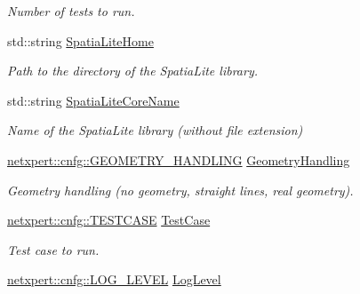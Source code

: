 \begin{DoxyCompactItemize}
\begin{DoxyCompactList}\small\item\em Number of tests to run. \end{DoxyCompactList}\item 
std\+::string \hyperlink{structnetxpert_1_1cnfg_1_1Config_a30e9c138aaee454b4b9f178a5d9fec0a}{Spatia\+Lite\+Home}\hypertarget{structnetxpert_1_1cnfg_1_1Config_a30e9c138aaee454b4b9f178a5d9fec0a}{}\label{structnetxpert_1_1cnfg_1_1Config_a30e9c138aaee454b4b9f178a5d9fec0a}

\begin{DoxyCompactList}\small\item\em Path to the directory of the Spatia\+Lite library. \end{DoxyCompactList}\item 
std\+::string \hyperlink{structnetxpert_1_1cnfg_1_1Config_a4df2574cae792012d65db17eaf3d0a22}{Spatia\+Lite\+Core\+Name}\hypertarget{structnetxpert_1_1cnfg_1_1Config_a4df2574cae792012d65db17eaf3d0a22}{}\label{structnetxpert_1_1cnfg_1_1Config_a4df2574cae792012d65db17eaf3d0a22}

\begin{DoxyCompactList}\small\item\em Name of the Spatia\+Lite library (without file extension) \end{DoxyCompactList}\item 
\hyperlink{namespacenetxpert_1_1cnfg_a1514d3ae51414bf0bcd8d1fe8e868b89}{netxpert\+::cnfg\+::\+G\+E\+O\+M\+E\+T\+R\+Y\+\_\+\+H\+A\+N\+D\+L\+I\+NG} \hyperlink{structnetxpert_1_1cnfg_1_1Config_abad7200444a8c97b59bc6978a7abeae6}{Geometry\+Handling}\hypertarget{structnetxpert_1_1cnfg_1_1Config_abad7200444a8c97b59bc6978a7abeae6}{}\label{structnetxpert_1_1cnfg_1_1Config_abad7200444a8c97b59bc6978a7abeae6}

\begin{DoxyCompactList}\small\item\em Geometry handling (no geometry, straight lines, real geometry). \end{DoxyCompactList}\item 
\hyperlink{namespacenetxpert_1_1cnfg_ae473d83baf6d2ee9328c66364eefc8df}{netxpert\+::cnfg\+::\+T\+E\+S\+T\+C\+A\+SE} \hyperlink{structnetxpert_1_1cnfg_1_1Config_a73f9299fb8e35e1f4a9946f37dc3d17c}{Test\+Case}\hypertarget{structnetxpert_1_1cnfg_1_1Config_a73f9299fb8e35e1f4a9946f37dc3d17c}{}\label{structnetxpert_1_1cnfg_1_1Config_a73f9299fb8e35e1f4a9946f37dc3d17c}

\begin{DoxyCompactList}\small\item\em Test case to run. \end{DoxyCompactList}\item 
\hyperlink{namespacenetxpert_1_1cnfg_ac9cb46108300f2d88ac15f7460ca0696}{netxpert\+::cnfg\+::\+L\+O\+G\+\_\+\+L\+E\+V\+EL} \hyperlink{structnetxpert_1_1cnfg_1_1Config_a41d9e5a7901723efc1afb53384a42826}{Log\+Level}\hypertarget{structnetxpert_1_1cnfg_1_1Config_a41d9e5a7901723efc1afb53384a42826}{}\label{structnetxpert_1_1cnfg_1_1Config_a41d9e5a7901723efc1afb53384a42826}


\end{DoxyCompactItemize}
